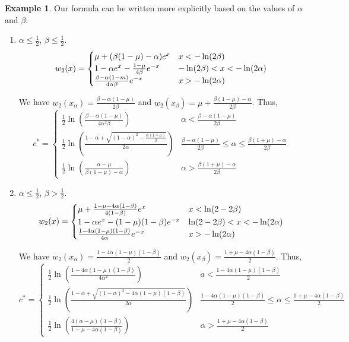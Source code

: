 \documentclass[11pt]{article}
\theoremstyle{definition}
\newtheorem{ex}[thm]{Example}
\numberwithin{equation}{section}
\numberwithin{thm}{section}
\renewcommand{\a}{\alpha}
\renewcommand{\b}{\beta}
\newcommand{\m}{\mu}
\begin{document}
\begin{ex}
Our formula can be written more explicitly based on the values of $\a$ and $\b$:
\begin{enumerate}[{Case} 1.]

\item $\a\leq\frac{1}{2}$, $\b\leq\frac{1}{2}$.
\begin{equation}
w_2(x) = \begin{cases}
\m + (\Conecaseone) e^x  & x < -\ln(2\b) \\
1 - \Ctwocaseone e^x - \Cthreecaseone e^{-x} & -\ln(2\b) < x < -\ln(2\a) \\
\Cfourcaseone e^{-x} & x > -\ln(2\a)
\end{cases}
\end{equation}

We have $w_2(x_\a)=\frac{\b-\a(1-\m)}{2\b}$ and $w_2(x_\b)=\m + \frac{\b(1-\m)-\a}{2\b}$. Thus,
\begin{equation}
c^* = \begin{cases}
\frac{1}{2} \ln \left( \frac{\b-\a(1-\m)}{4\a^2\b} \right) & \a < \frac{\b-\a(1-\m)}{2\b} \\
\frac{1}{2} \ln \left( \frac{1-\a + \sqrt{(1-\a)^2 - \frac{\a(1-\m)}{\b}}}{2\a} \right) & \frac{\b-\a(1-\m)}{2\b} \leq \a \leq \frac{\b(1+\m)-\a}{2\b} \\
\frac{1}{2} \ln \left( \frac{\a-\m}{\b(1-\m)-\a}\right) & \a > \frac{\b(1+\m)-\a}{2\b}
\end{cases}
\end{equation}


\item $\a\leq\frac{1}{2}$, $\b>\frac{1}{2}$.
\begin{equation}
w_2(x) = \begin{cases}
\m + \Conecasetwo e^x  & x < \ln(2-2\b) \\
1 - \Ctwocaseone e^x - \Cthreecasetwo e^{-x} & \ln(2-2\b) < x < -\ln(2\a) \\
\Cfourcasetwo e^{-x} & x > -\ln(2\a)
\end{cases}
\end{equation}

We have $w_2(x_\a)=\frac{1-4\a(1-\m)(1-\b)}{2}$ and $w_2(x_\b)=\frac{1+\m-4\a(1-\b)}{2}$. Thus,
\begin{equation}
c^* = \begin{cases}
\frac{1}{2} \ln \left( \frac{1-4\a(1-\m)(1-\b)}{4\a^2} \right) & a<\frac{1-4\a(1-\m)(1-\b)}{2} \\
\frac{1}{2} \ln \left( \frac{1-\a + \sqrt{(1-\a)^2 - 4\a(1-\m)(1-\b)}}{2\a} \right) & \frac{1-4\a(1-\m)(1-\b)}{2}\leq\a\leq\frac{1+\m-4\a(1-\b)}{2} \\
\frac{1}{2} \ln \left( \frac{4(\a-\m)(1-\b)}{1-\m-4\a(1-\b)}\right) & \a>\frac{1+\m-4\a(1-\b)}{2}
\end{cases}
\end{equation}



\end{enumerate}
\end{ex}
\end{document}
